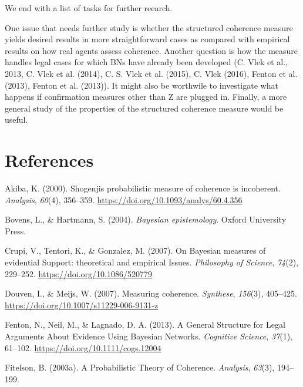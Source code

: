\documentclass[10pt,]{scrartcl}
\newcommand{\s}[1]{\mbox{\textsf{#1}}}
\begin{document}
We end with a list of tasks for further reearch.

One issue that needs further study is whether the structured coherence
measure yields desired results in more straightforward cases as compared
with empirical results on how real agents assess coherence. Another
question is how the measure handles legal cases for which BNs have
already been developed (C. Vlek et al., 2013, C. Vlek et al. (2014), C.
S. Vlek et al. (2015), C. Vlek (2016), Fenton et al. (2013), Fenton et
al. (2013)). It might also be worthwile to investigate what happens if
confirmation measures other than \s{Z} are plugged in. Finally, a more
general study of the properties of the structured coherence measure
would be useful.

\newpage 

\footnotesize

\section*{References}\label{references}

\hypertarget{refs}{}
\hypertarget{ref-Akiba2000Shogenjis}{}
Akiba, K. (2000). Shogenjis probabilistic measure of coherence is
incoherent. \emph{Analysis}, \emph{60}(4), 356--359.
\url{https://doi.org/10.1093/analys/60.4.356}

\hypertarget{ref-bovens2004bayesian}{}
Bovens, L., \& Hartmann, S. (2004). \emph{Bayesian epistemology}. Oxford
University Press.

\hypertarget{ref-crupi2007BayesianMeasuresEvidential}{}
Crupi, V., Tentori, K., \& Gonzalez, M. (2007). On Bayesian measures of
evidential Support: theoretical and empirical Issues. \emph{Philosophy
of Science}, \emph{74}(2), 229--252.
\url{https://doi.org/10.1086/520779}

\hypertarget{ref-Douven2007Measuring}{}
Douven, I., \& Meijs, W. (2007). Measuring coherence. \emph{Synthese},
\emph{156}(3), 405--425. \url{https://doi.org/10.1007/s11229-006-9131-z}

\hypertarget{ref-fenton2013GeneralStructureLegal}{}
Fenton, N., Neil, M., \& Lagnado, D. A. (2013). A General Structure for
Legal Arguments About Evidence Using Bayesian Networks. \emph{Cognitive
Science}, \emph{37}(1), 61--102.
\url{https://doi.org/10.1111/cogs.12004}

\hypertarget{ref-fitelson2003ProbabilisticTheoryCoherence}{}
Fitelson, B. (2003a). A Probabilistic Theory of Coherence.
\emph{Analysis}, \emph{63}(3), 194--199.
\end{document}
